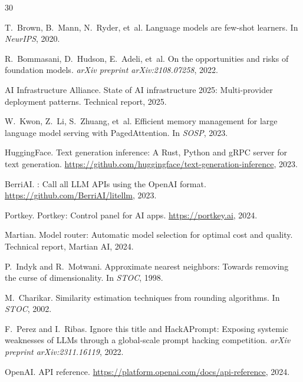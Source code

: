 \documentclass[11pt,twocolumn]{article}
\begin{document}
\begin{thebibliography}{30}

T.~Brown, B.~Mann, N.~Ryder, et~al.
\newblock Language models are few-shot learners.
\newblock In \emph{NeurIPS}, 2020.

R.~Bommasani, D.~Hudson, E.~Adeli, et~al.
\newblock On the opportunities and risks of foundation models.
\newblock \emph{arXiv preprint arXiv:2108.07258}, 2022.

AI Infrastructure Alliance.
\newblock State of AI infrastructure 2025: Multi-provider deployment patterns.
\newblock Technical report, 2025.

W.~Kwon, Z.~Li, S.~Zhuang, et~al.
\newblock Efficient memory management for large language model serving with {PagedAttention}.
\newblock In \emph{SOSP}, 2023.

HuggingFace.
\newblock Text generation inference: A {Rust}, {Python} and {gRPC} server for text generation.
\newblock \url{https://github.com/huggingface/text-generation-inference}, 2023.

BerriAI.
: Call all {LLM} {APIs} using the {OpenAI} format.
\newblock \url{https://github.com/BerriAI/litellm}, 2023.

Portkey.
\newblock Portkey: Control panel for {AI} apps.
\newblock \url{https://portkey.ai}, 2024.

Martian.
\newblock Model router: Automatic model selection for optimal cost and quality.
\newblock Technical report, Martian AI, 2024.

P.~Indyk and R.~Motwani.
\newblock Approximate nearest neighbors: Towards removing the curse of dimensionality.
\newblock In \emph{STOC}, 1998.

M.~Charikar.
\newblock Similarity estimation techniques from rounding algorithms.
\newblock In \emph{STOC}, 2002.

F.~Perez and I.~Ribas.
\newblock Ignore this title and {HackAPrompt}: Exposing systemic weaknesses of {LLMs} through a global-scale prompt hacking competition.
\newblock \emph{arXiv preprint arXiv:2311.16119}, 2022.

OpenAI.
 {API} reference.
\newblock \url{https://platform.openai.com/docs/api-reference}, 2024.


\end{thebibliography}
\end{document}
